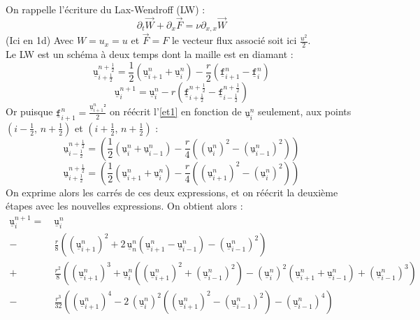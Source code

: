\documentclass[a4paper,12pt]{article}
\newcommand{\bepar}[1]{
	\left( #1 \right)  
}
\newcommand{\uin}[2]{
	\underline{\texttt{u}}_{#1}^{#2}
}
\newcommand{\ui}[1]{
	\underline{\texttt{u}}_{#1}^{n}
}
\numberwithin{equation}{section} %
\begin{document}
On rappelle l'écriture du Lax-Wendroff (LW) :
\begin{equation}
\partial_t \vec{W} +  \partial_x \vec{F} = \nu \partial_{x,x} \vec{W}
\end{equation}
(Ici en 1d) Avec $W = u_x = u $ et $\vec{F} = F$ le vecteur flux associé soit ici $\displaystyle \frac{u^2}{2}$.\\
Le LW est un schéma à deux temps dont la maille est en diamant :
\begin{equation} \tag{\'etape 1}
\uin{i + \frac{1}{2}}{n + \frac{1}{2}} = \frac{1}{2} \bepar{\uin{i+1}{n} + \uin{i}{n}} - \frac{r}{2} \bepar{\underline{\texttt{f}}_{i+1}^n - \underline{\texttt{f}}_{i}^n} \label{et1}
\end{equation}
\begin{equation} \tag{\'etape 2}
\uin{i}{n+1} = \uin{i}{n} - r \bepar{\underline{\texttt{f}}_{i+\frac{1}{2}}^{n + \frac{1}{2}} - \underline{\texttt{f}}_{i-\frac{1}{2}}^{n + \frac{1}{2}}} \label{et2}
\end{equation}
Or puisque $\displaystyle \underline{\texttt{f}}_{i+1}^n = \frac{\uin{i+1}{n} ²}{2}$ on réécrit l'\ref{et1} en fonction de $\uin{i}{n}$ seulement, aux points $\bepar{ i - \frac{1}{2},\, n+\frac{1}{2}}$ et $\bepar{ i + \frac{1}{2},\, n+\frac{1}{2}}$   :
\begin{equation}
\uin{i - \frac{1}{2}}{n+\frac{1}{2}} = \bepar{\frac{1}{2}\bepar{\uin{i}{n}+\uin{i-1}{n}} - \frac{r}{4}\bepar{\bepar{\uin{i}{n}}^2 - \bepar{\uin{i-1}{n}}^2}}
\end{equation}
\begin{equation}
\uin{i + \frac{1}{2}}{n+\frac{1}{2}} = \bepar{\frac{1}{2}\bepar{\uin{i+1}{n}+\uin{i}{n}} - \frac{r}{4}\bepar{\bepar{\uin{i+1}{n}}^2 - \bepar{\uin{i}{n}}^2}}
\end{equation}
On exprime alors les carrés de ces deux expressions, et on réécrit la deuxième étapes avec les nouvelles expressions. On obtient alors :
\begin{align*}
\uin{i}{n+1} =\  &\uin{i}{n} \\
 -\ & \frac{r}{8} \bepar{\bepar{\ui{i+1}}^2 + 2\, \ui{n}\bepar{\ui{i+1} - \ui{i-1}} - \bepar{\ui{i-1}}^2} \\
+ & \frac{r^2}{8}\bepar{\bepar{\ui{i+1}}^3 +\ui{i}\bepar{\bepar{\ui{i+1}}^2 + \bepar{\ui{i-1}}^2} - \bepar{ \ui{i}}^2\bepar{\ui{i+1} + \ui{i-1}} + \bepar{\ui{i-1}}^3 } \\
-\ & \frac{r^3}{32} \bepar{\bepar{\ui{i+1}}^4 -2\,\bepar{\ui{i}}^2 \bepar{\bepar{\ui{i+1}}^2 - \bepar{\ui{i-1}}^2} - \bepar{\ui{i-1}}^4}
\end{align*}
\end{document}
